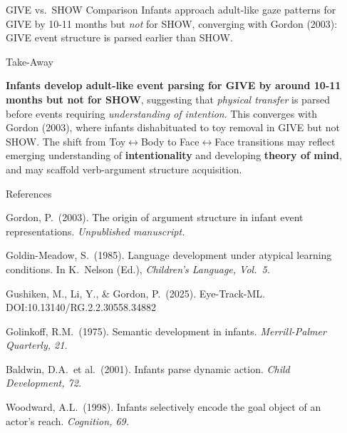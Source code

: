 \documentclass[final]{beamer}
\newlength{\sepwidth}
\newlength{\colwidth}
\newcommand{\separatorcolumn}{\begin{column}{\sepwidth}\end{column}}
\begin{document}
\begin{frame}[t]
\begin{columns}[t]
\begin{column}{\colwidth}
\begin{alertblock}{GIVE vs.\ SHOW Comparison}
    Infants approach adult-like gaze patterns for GIVE by 10-11 months but \textit{not} for SHOW, converging with Gordon (2003): GIVE event structure is parsed earlier than SHOW.

  \end{alertblock}

  \begin{block}{Take-Away}

    \textbf{Infants develop adult-like event parsing for GIVE by around 10-11 months but not for SHOW}, suggesting that \textit{physical transfer} is parsed before events requiring \textit{understanding of intention}. This converges with Gordon (2003), where infants dishabituated to toy removal in GIVE but not SHOW. The shift from Toy$\leftrightarrow$Body to Face$\leftrightarrow$Face transitions may reflect emerging understanding of \textbf{intentionality} and developing \textbf{theory of mind}, and may scaffold verb-argument structure acquisition.

  \end{block}

  \begin{block}{References}

    \footnotesize
    Gordon, P.\ (2003). The origin of argument structure in infant event representations. \textit{Unpublished manuscript.}\par
    Goldin-Meadow, S.\ (1985). Language development under atypical learning conditions. In K.\ Nelson (Ed.), \textit{Children's Language, Vol.\ 5.}\par
    Gushiken, M., Li, Y., \& Gordon, P.\ (2025). Eye-Track-ML. DOI:10.13140/RG.2.2.30558.34882\par
    Golinkoff, R.M.\ (1975). Semantic development in infants. \textit{Merrill-Palmer Quarterly, 21.}\par
    Baldwin, D.A.\ et al.\ (2001). Infants parse dynamic action. \textit{Child Development, 72.}\par
    Woodward, A.L.\ (1998). Infants selectively encode the goal object of an actor's reach. \textit{Cognition, 69.}

  \end{block}

\end{column}

\separatorcolumn
\end{columns}
\end{frame}
\end{document}
